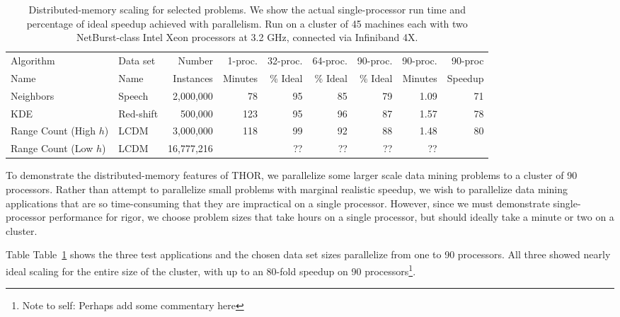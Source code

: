 \documentclass[twoside,leqno,twocolumn]{article}
\newcommand{\authornote}[1]{\footnote{Note to self: #1}}
\newcommand{\authorsnote}[1]{\authornote{#1}}
\newcommand{\tab}[1]{Table~\ref{tab:#1}}
\begin{document}
\begin{table}
  \centering
  \begin{tabular}{|l|l|r|r||r|r|r||r|r|}
    \hline
    Algorithm               & Data set  & Number     & 1-proc. & 32-proc.  & 64-proc.  & 90-proc.  & 90-proc. & 90-proc
    \\
    Name                    & Name      & Instances  & Minutes & \% Ideal & \% Ideal & \% Ideal & Minutes & Speedup
    \\ \hline \hline
    Neighbors               & Speech    & 2,000,000  & 78  & 95 & 85 & 79 & 1.09 & 71
    \\ \hline
    KDE                     & Red-shift & 500,000    & 123 & 95 & 96 & 87 & 1.57 & 78
    \\ \hline
    Range Count (High $h$)  & LCDM      & 3,000,000  & 118 & 99 & 92 & 88 & 1.48 & 80
    \\ \hline
    Range Count (Low $h$)   & LCDM      & 16,777,216 &     & ?? & ?? & ?? & ?? &
    \\ \hline
  \end{tabular}
  \caption{
  \label{tab:distributed}
  Distributed-memory scaling for selected problems.
  We show the actual single-processor run time and percentage of ideal speedup achieved with parallelism.
  Run on a cluster of 45 machines each with two NetBurst-class Intel Xeon processors at 3.2 GHz, connected via Infiniband 4X.
  }
\end{table}

To demonstrate the distributed-memory features of THOR, we parallelize some larger scale data mining problems to a cluster of 90 processors.
Rather than attempt to parallelize small problems with marginal realistic speedup, we wish to parallelize data mining applications that are so time-consuming that they are impractical on a single processor.
However, since we must demonstrate single-processor performance for rigor, we choose problem sizes that take hours on a single processor, but should ideally take a minute or two on a cluster.

Table \tab{distributed} shows the three test applications and the chosen data set sizes parallelize from one to 90 processors.
All three showed nearly ideal scaling for the entire size of the cluster, with up to an 80-fold speedup on 90 processors\authorsnote{Perhaps add some commentary here}.

\end{document}
